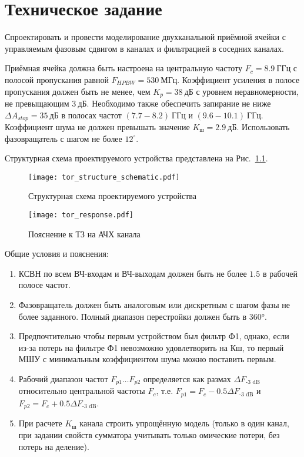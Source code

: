 \chapter{Техническое задание}

Спроектировать и провести моделирование двухканальной приёмной ячейки с управляемым фазовым сдвигом в каналах и фильтрацией в соседних каналах.

Приёмная ячейка должна быть настроена на центральную частоту $F_c = 8.9~\text{ГГц}$ с полосой пропускания равной $F_{HPBW} = 530~\text{МГц}$.
Коэффициент усиления в полосе пропускания должен быть не менее, чем $K_p = 38~\text{дБ}$ с уровнем неравномерности, не превыщающим $3~\text{дБ}$.
Необходимо также обеспечить запирание не ниже $\Delta A_{stop} = 35~\text{дБ}$ в полосах частот $(7.7-8.2)~\text{ГГц}$ и $(9.6-10.1)~\text{ГГц}$.
Коэффициент шума не должен превышать значение $K_{ш} = 2.9~\text{дБ}$.
Использовать фазовращатель с шагом не более $12^\circ$.

Структурная схема проектируемого устройства представлена на Рис.~\ref{fig:tor_structure_schematic}.

\begin{figure}[!ht]
    \centering
    \texttt{[image: tor\_structure\_schematic.pdf]}
    \caption{Структурная схема проектируемого устройства}%
    \label{fig:tor_structure_schematic}
\end{figure}

\begin{figure}[!ht]
    \centering
    \texttt{[image: tor\_response.pdf]}
    \caption{Пояснение к ТЗ на АЧХ канала}%
    \label{fig:tor_response}
\end{figure}

Общие условия и пояснения:
\begin{enumerate}
    \item
        КСВН по всем ВЧ-входам и ВЧ-выходам должен быть не более $1.5$ в рабочей полосе частот.
    \item
        Фазовращатель должен быть аналоговым или дискретным с шагом фазы не более заданного.
        Полный диапазон перестройки должен быть в 360°.
    \item
        Предпочтительно чтобы первым устройством был фильтр Ф1, однако, если из-за потерь на фильтре Ф1 невозможно удовлетворить на Кш, то первый МШУ с минимальным коэффициентом шума можно поставить первым.
    \item
        Рабочий диапазон частот $F_{p1} \ldots F_{p2}$ определяется как размах $\Delta F_\text{-3~dB}$ относительно центральной частоты $F_c$, т.е. $F_{p1} = F_c - 0.5 \Delta F_\text{-3~dB}$ и $F_{p2} = F_c + 0.5 \Delta F_\text{-3~dB}$.
    \item
        При расчете $K_\text{ш}$ канала строить упрощённую модель (только в один канал, при задании свойств сумматора учитывать только омические потери, без потерь на деление).
\end{enumerate}
